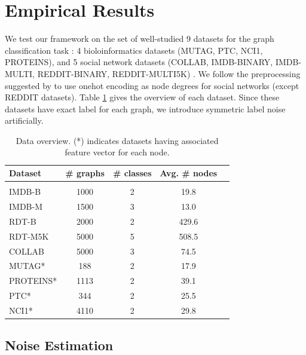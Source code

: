 \documentclass[letterpaper]{article}
\begin{document}
\section{Empirical Results}

We test our framework on the set of well-studied 9 datasets for the graph 
classification task : 4 bioloinformatics datasets (MUTAG, PTC, NCI1, PROTEINS),
and 5 social network datasets (COLLAB, IMDB-BINARY, IMDB-MULTI, REDDIT-BINARY, REDDIT-MULTI5K)
\cite{gin,graphsage,anonwalk,yanardag2015}. We follow the preprocessing suggested by \cite{gin} 
to use onehot encoding as node degrees for social networks (except REDDIT datasets). 
Table \ref{t:data} gives the overview of each dataset. Since these datasets have exact 
label for each graph, we introduce symmetric label noise artificially.

\begin{table}[h]
\caption{Data overview. (*) indicates datasets having associated 
feature vector for each node.}
\label{t:data}
\begin{center}
\begin{tabular}{l|cccc}
\bf Dataset & \# graphs & \# classes & Avg. \# nodes \\
\hline \\
IMDB-B   & 1000 & 2 & 19.8  \\   
IMDB-M   & 1500 & 3 & 13.0  \\ 
RDT-B    & 2000 & 2 & 429.6 \\    
RDT-M5K  & 5000 & 5 & 508.5 \\       
COLLAB   & 5000 & 3 & 74.5  \\     
MUTAG*   & 188  & 2 & 17.9  \\    
PROTEINS*& 1113 & 2 & 39.1  \\       
PTC*     & 344  & 2 & 25.5  \\  
NCI1*    & 4110 & 2 & 29.8  \\   
\end{tabular}
\end{center}
\end{table}

\subsection{Noise Estimation}
\end{document}
